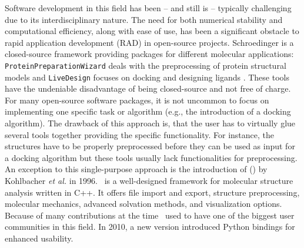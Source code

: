 Software development in this field has been -- and still is -- typically challenging due to its interdisciplinary nature. The need for both numerical stability and computational efficiency, along with ease of use, has been a significant obstacle to rapid application development (RAD) in open-source projects. 
Schroedinger is a closed-source framework providing packages for different molecular applications: \texttt{ProteinPreparationWizard} deals with the preprocessing of protein structural models and \texttt{LiveDesign} focuses on docking and designing ligands \cite{SchrödingerPPW, SchrödingerLiveDesign}. These tools have the undeniable disadvantage of being closed-source and not free of charge. \\
For many open-source software packages, it is not uncommon to focus on implementing one specific task or algorithm (e.g., the introduction of a docking algorithm). The drawback of this approach is, that the user has to virtually glue several tools together providing the specific functionality. For instance, the structures have to be properly preprocessed before they can be used as input for a docking algorithm but these tools usually lack functionalities for preprocessing.  \\
An exception to this single-purpose approach is the introduction of \ballFull (\ball) by Kohlbacher \textit{et al.} in 1996. \ball\ is a well-designed framework for molecular structure analysis written in C++. It offers file import and export, structure preprocessing, molecular mechanics, advanced solvation methods, and visualization options. Because of many contributions at the time \ball\ used to have one of the biggest user communities in this field. In 2010, a new version introduced Python bindings for enhanced usability.\\

